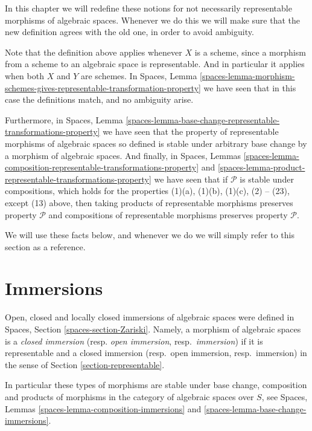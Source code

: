 \medskip\noindent
In this chapter we will redefine these notions for not necessarily
representable morphisms of algebraic spaces. Whenever we do this we will make
sure that the new definition agrees with the old one, in order to avoid
ambiguity.

\medskip\noindent
Note that the definition above applies whenever $X$ is a scheme,
since a morphism from a scheme to an algebraic space is representable.
And in particular it applies when both $X$ and $Y$ are schemes.
In Spaces, Lemma
\ref{spaces-lemma-morphism-schemes-gives-representable-transformation-property}
we have seen that in this case the definitions
match, and no ambiguity arise.

\medskip\noindent
Furthermore, in Spaces,
Lemma \ref{spaces-lemma-base-change-representable-transformations-property}
we have seen that the property of
representable morphisms of algebraic spaces so defined is stable under
arbitrary base change by a morphism of algebraic spaces.
And finally, in Spaces, Lemmas
\ref{spaces-lemma-composition-representable-transformations-property}
and
\ref{spaces-lemma-product-representable-transformations-property}
we have seen that if $\mathcal{P}$ is stable under compositions,
which holds for the properties
(1)(a), (1)(b), (1)(c), (2) -- (23), except (13) above, then
taking products of representable morphisms preserves property $\mathcal{P}$ 
and compositions of representable morphisms preserves property $\mathcal{P}$.

\medskip\noindent
We will use these facts below, and whenever we do we will simply refer
to this section as a reference.





\section{Immersions}
\label{section-immersions}

\noindent
Open, closed and locally closed immersions of algebraic spaces were defined in
Spaces, Section \ref{spaces-section-Zariski}.
Namely, a morphism of algebraic spaces is a
{\it closed immersion} (resp. {\it open immersion}, resp.\ {\it immersion})
if it is representable and a closed immersion (resp.\ open immersion,
resp.\ immersion) in the sense of Section \ref{section-representable}.

\medskip\noindent
In particular these types of morphisms are stable under base change,
composition and products of morphisms in the category of algebraic
spaces over $S$, see
Spaces, Lemmas \ref{spaces-lemma-composition-immersions} and
\ref{spaces-lemma-base-change-immersions}.

